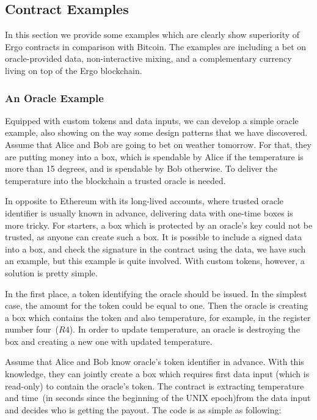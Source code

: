 \subsection{Contract Examples}
\label{sec:examples}

 In this section we provide some examples which are clearly show superiority of Ergo contracts in comparison with
 Bitcoin. The examples are including a bet on oracle-provided data, non-interactive mixing, and a complementary currency
 living on top of the Ergo blockchain.

 \subsubsection{An Oracle Example}
 \label{sec:platform}

 Equipped with custom tokens and data inputs, we can develop a simple oracle example, also showing on the way some
 design patterns that we have discovered. Assume that Alice and Bob are going to bet on weather tomorrow. For that,
 they are putting money into a box, which is spendable by
 Alice if the temperature is more than 15 degrees, and is spendable by Bob otherwise. To deliver the temperature into the
 blockchain a trusted oracle is needed.

 In opposite to Ethereum with its long-lived accounts, where trusted oracle identifier is usually known in advance,
 delivering data with one-time boxes is more tricky. For starters, a box which is protected by an oracle's key could
 not be trusted, as anyone can create such a box. It is possible to include a signed data into a box, and check the
 signature in the contract using the data, we have such an example, but this example is quite involved. With custom
 tokens, however, a solution is pretty simple.

 In the first place, a token identifying the oracle should be issued. In the simplest case, the amount for the token could
 be equal to one. Then the oracle is creating a box which contains the token and also temperature, for example, in the
 register number four~($R4$). In order to update temperature, an oracle is destroying the box and creating a
 new one with updated temperature.

 Assume that Alice and Bob know oracle's token identifier in advance. With this knowledge, they
 can jointly create a box which requires first data input (which is read-only) to contain the oracle's token. The
 contract is extracting temperature and time~(in seconds since the beginning of the UNIX epoch)from the data input
 and decides who is getting the payout. The code is as simple as following:

